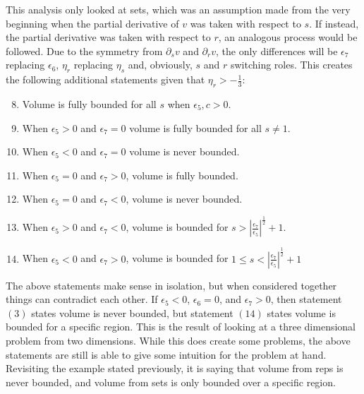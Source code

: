 This analysis only looked at sets, which was an assumption made from the very beginning when the partial derivative of $v$ was taken with respect to $s$. If instead, the partial derivative was taken with respect to $r$, an analogous process would be followed. Due to the symmetry from $\partial_sv$ and $\partial_r v$, the only differences will be $\epsilon_7$ replacing $\epsilon_6$, $\eta_r$ replacing $\eta_s$ and, obviously, $s$ and $r$ switching roles. This creates the following additional statements given that $\eta_r>-\frac{1}{3}$:

\begin{enumerate}
    \setcounter{enumi}{7}
    \item Volume is fully bounded for all $s$ when $\epsilon_5,c>0$.
    \item When $\epsilon_5>0$ and $\epsilon_7=0$ volume is fully bounded for all $s\ne 1$.
    \item When $\epsilon_5<0$ and $\epsilon_7=0$ volume is never bounded.
    \item When $\epsilon_5=0$ and $\epsilon_7>0$, volume is fully bounded.
    \item When $\epsilon_5=0$ and $\epsilon_7<0$, volume is never bounded.
    \item When $\epsilon_5>0$ and $\epsilon_7<0$, volume is bounded for $s>\left| \frac{\epsilon_7}{\epsilon_5} \right|^\frac{1}{2}+1$.
    \item When $\epsilon_5<0$ and $\epsilon_7>0$, volume is bounded for $1\le s < \left| \frac{\epsilon_7}{\epsilon_5} \right|^\frac{1}{2}+1$
\end{enumerate}

%

The above statements make sense in isolation, but when considered together things can contradict each other. If $\epsilon_5<0$, $\epsilon_6=0$, and $\epsilon_7>0$, then  statement $(3)$ states volume is never bounded, but statement $(14)$ states volume is bounded for a specific region. This is the result of looking at a three dimensional problem from two dimensions. While this does create some problems, the above statements are still is able to give some intuition for the problem at hand. Revisiting the example stated previously, it is saying that volume from reps is never bounded, and volume from sets is only bounded over a specific region.

